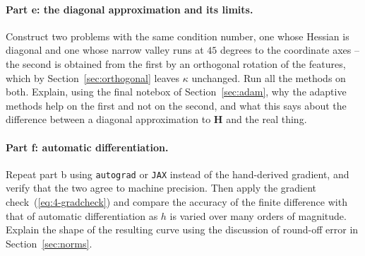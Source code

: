 \paragraph{Part e: the diagonal approximation and its limits.}
Construct two problems with the same condition number, one whose Hessian is
diagonal and one whose narrow valley runs at $45$ degrees to the coordinate
axes -- the second is obtained from the first by an orthogonal rotation of the
features, which by Section~\ref{sec:orthogonal} leaves $\kappa$ unchanged.
Run all the methods on both.  Explain, using the final notebox of
Section~\ref{sec:adam}, why the adaptive methods help on the first and not on
the second, and what this says about the difference between a diagonal
approximation to $\bm{H}$ and the real thing.

\paragraph{Part f: automatic differentiation.}
Repeat part b using \texttt{autograd} or \texttt{JAX} instead of the
hand-derived gradient, and verify that the two agree to machine precision.
Then apply the gradient check~(\ref{eq:4-gradcheck}) and compare the accuracy
of the finite difference with that of automatic differentiation as $h$ is
varied over many orders of magnitude.  Explain the shape of the resulting
curve using the discussion of round-off error in
Section~\ref{sec:norms}.

